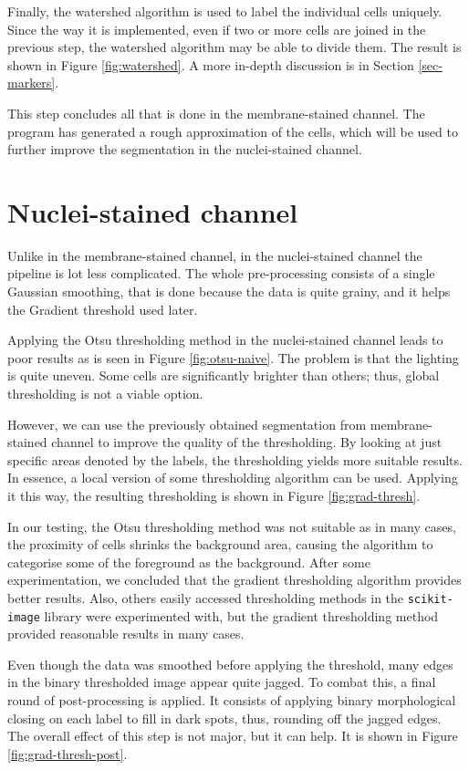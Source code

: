 \documentclass[
  digital,     %
  oneside,     %
  nosansbold,  %
  nocolorbold, %
  lof,         %
  lot,         %
]{fithesis4}
\begin{document}
Finally, the watershed algorithm is used to label the individual cells uniquely.
Since the way it is implemented, even if two or more cells are joined in the
previous step, the watershed algorithm may be able to divide them. The result
is shown in Figure \ref{fig:watershed}. A more in-depth discussion is in Section
\ref{sec-markers}.

This step concludes all that is done in the membrane-stained channel. The
program has generated a rough approximation of the cells, which will be used to
further improve the segmentation in the nuclei-stained channel.

\section{Nuclei-stained channel}
Unlike in the membrane-stained channel, in the nuclei-stained channel the
pipeline is lot less complicated. The whole pre-processing consists of a single
Gaussian smoothing, that is done because the data is quite grainy, and it helps
the Gradient threshold used later.

Applying the Otsu thresholding method in the nuclei-stained channel leads to
poor results as is seen in Figure \ref{fig:otsu-naive}. The problem is that the
lighting is quite uneven. Some cells are significantly brighter than others;
thus, global thresholding is not a viable option.

However, we can use the previously obtained segmentation from membrane-stained
channel to improve the quality of the thresholding. By looking at just specific
areas denoted by the labels, the thresholding yields more suitable results. In
essence, a local version of some thresholding algorithm can be used. Applying it
this way, the resulting thresholding is shown in Figure \ref{fig:grad-thresh}.

In our testing, the Otsu thresholding method was not suitable as in many cases, the
proximity of cells shrinks the background area, causing the algorithm to
categorise some of the foreground as the background. After some experimentation,
we concluded that the gradient thresholding algorithm provides better results.
Also, others easily accessed thresholding methods in the \texttt{scikit-image}
library were experimented with, but the gradient thresholding method provided
reasonable results in many cases.

Even though the data was smoothed before applying the threshold, many edges in
the binary thresholded image appear quite jagged. To combat this, a final round
of post-processing is applied. It consists of applying binary morphological
closing on each label to fill in dark spots, thus, rounding off the jagged edges.
The overall effect of this step is not major, but it can help. It is shown in
Figure \ref{fig:grad-thresh-post}.
\end{document}
